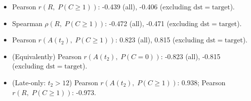 \begin{itemize}
  \item Pearson $r(R,\;P(C\ge1))$: -0.439 (all), -0.406 (excluding $\mathrm{dst}=\mathrm{target}$).
  \item Spearman $\rho(R,\;P(C\ge1))$: -0.472 (all), -0.471 (excluding $\mathrm{dst}=\mathrm{target}$).
  \item Pearson $r(A(t_2),\;P(C\ge1))$: 0.823 (all), 0.815 (excluding $\mathrm{dst}=\mathrm{target}$).
  \item (Equivalently) Pearson $r(A(t_2),\;P(C=0))$: -0.823 (all), -0.815 (excluding $\mathrm{dst}=\mathrm{target}$).
  \item (Late-only: $t_2>12$) Pearson $r(A(t_2),\;P(C\ge1))$: 0.938; Pearson $r(R,\;P(C\ge1))$: -0.973.
\end{itemize}

